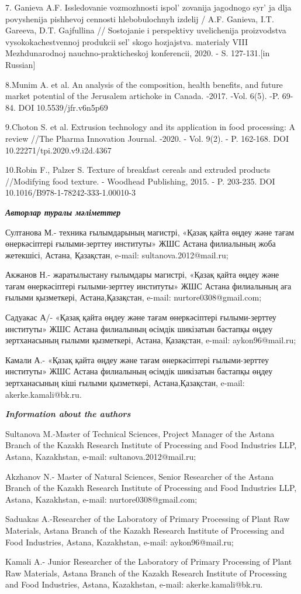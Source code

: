 7. Ganieva A.F. Issledovanie vozmozhnosti ispol' zovanija
jagodnogo syr' ja dlja povyshenija pishhevoj cennosti
hlebobulochnyh izdelij / A.F. Ganieva, I.T. Gareeva, D.T. Gajfullina //
Sostojanie i perspektivy uvelichenija proizvodstva vysokokachestvennoj
produkcii sel' skogo hozjajstva. materialy VIII
Mezhdunarodnoj nauchno-prakticheskoj konferencii, 2020. - S.
127-131.{[}in Russian{]}

8.Munim A. et al. An analysis of the composition, health benefits, and
future market potential of the Jerusalem artichoke in Canada. -2017.
-Vol. 6(5). -P. 69-84. DOI 10.5539/jfr.v6n5p69

9.Choton S. et al. Extrusion technology and its application in food
processing: A review //The Pharma Innovation Journal. -2020. - Vol.
9(2). - P. 162-168. DOI 10.22271/tpi.2020.v9.i2d.4367

10.Robin F., Palzer S. Texture of breakfast cereals and extruded
products //Modifying food texture. - Woodhead Publishing, 2015. - P.
203-235. DOI 10.1016/B978-1-78242-333-1.00010-3

\emph{{\bfseries Авторлар туралы мәліметтер}}

Султанова М.- техника ғылымдарының магистрі, «Қазақ қайта өңдеу және
тағам өнеркәсіптері ғылыми-зерттеу институты» ЖШС Астана филиалының жоба
жетекшісі, Астана, Қазақстан, e-mail: sultanova.2012@mail.ru;

Акжанов Н.- жаратылыстану ғылымдары магистрі, «Қазақ қайта өңдеу және
тағам өнеркәсіптері ғылыми-зерттеу институты» ЖШС Астана филиалының аға
ғылыми қызметкері, Астана,Қазақстан, e-mail: nurtore0308@gmail.com;

Садуакас А/- «Қазақ қайта өңдеу және тағам өнеркәсіптері ғылыми-зерттеу
институты» ЖШС Астана филиалының өсімдік шикізатын бастапқы өңдеу
зертханасының ғылыми қызметкері, Астана, Қазақстан, e-mail:
aykon96@mail.ru;

Камали А.- «Қазақ қайта өңдеу және тағам өнеркәсіптері ғылыми-зерттеу
институты» ЖШС Астана филиалының өсімдік шикізатын бастапқы өңдеу
зертханасының кіші ғылыми қызметкері, Астана,Қазақстан, e-mail:
akerke.kamali@bk.ru.

\emph{{\bfseries Information about the authors}}

Sultanova M.-Master of Technical Sciences, Project Manager of the Astana
Branch of the Kazakh Research Institute of Processing and Food
Industries LLP, Astana, Kazakhstan, e-mail: sultanova.2012@mail.ru;

Akzhanov N.- Master of Natural Sciences, Senior Researcher of the Astana
Branch of the Kazakh Research Institute of Processing and Food
Industries LLP, Astana, Kazakhstan, e-mail: nurtore0308@gmail.com;

Saduakas A.-Researcher of the Laboratory of Primary Processing of Plant
Raw Materials, Astana Branch of the Kazakh Research Institute of
Processing and Food Industries, Astana, Kazakhstan, e-mail:
aykon96@mail.ru;

Kamali A.- Junior Researcher of the Laboratory of Primary Processing of
Plant Raw Materials, Astana Branch of the Kazakh Research Institute of
Processing and Food Industries, Astana, Kazakhstan, e-mail:
akerke.kamali@bk.ru.